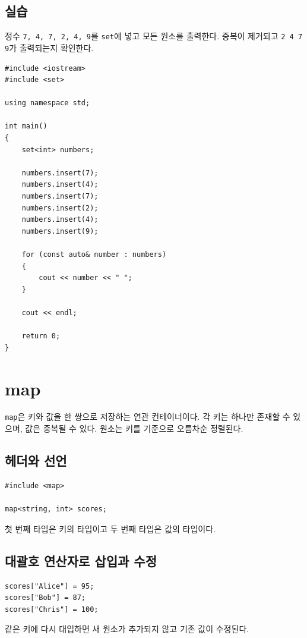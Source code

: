 \documentclass[11pt,a4paper]{article}
\begin{document}
\subsection{실습}
\begin{practicebox}
정수 \texttt{7, 4, 7, 2, 4, 9}를 \texttt{set}에 넣고 모든 원소를 출력한다. 중복이 제거되고 \texttt{2 4 7 9}가 출력되는지 확인한다.
\end{practicebox}

\begin{lstlisting}
#include <iostream>
#include <set>

using namespace std;

int main()
{
    set<int> numbers;

    numbers.insert(7);
    numbers.insert(4);
    numbers.insert(7);
    numbers.insert(2);
    numbers.insert(4);
    numbers.insert(9);

    for (const auto& number : numbers)
    {
        cout << number << " ";
    }

    cout << endl;

    return 0;
}
\end{lstlisting}

\section{map}
\texttt{map}은 키와 값을 한 쌍으로 저장하는 연관 컨테이너이다. 각 키는 하나만 존재할 수 있으며, 값은 중복될 수 있다. 원소는 키를 기준으로 오름차순 정렬된다.

\subsection{헤더와 선언}
\begin{lstlisting}
#include <map>

map<string, int> scores;
\end{lstlisting}

첫 번째 타입은 키의 타입이고 두 번째 타입은 값의 타입이다.

\subsection{대괄호 연산자로 삽입과 수정}
\begin{lstlisting}
scores["Alice"] = 95;
scores["Bob"] = 87;
scores["Chris"] = 100;
\end{lstlisting}

같은 키에 다시 대입하면 새 원소가 추가되지 않고 기존 값이 수정된다.
\end{document}
